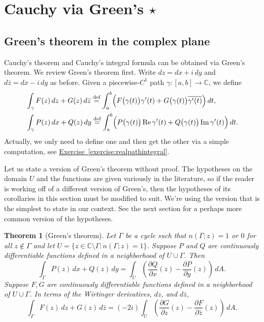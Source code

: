 \documentclass[12pt,openany]{book}
\renewcommand{\Re}{\operatorname{Re}}
\renewcommand{\Im}{\operatorname{Im}}
\newcommand{\C}{{\mathbb{C}}}
\theoremstyle{plain}
\newtheorem{thm}{Theorem}[section]
\theoremstyle{remark}
\theoremstyle{definition}
\theoremstyle{exercise}
\theoremstyle{example}
\newcommand{\exerciseref}[1]{\hyperref[#1]{Exercise~\ref*{#1}}}
\begin{document}

\section{Cauchy via Green's \texorpdfstring{$\star$}{*}}

\subsection{Green's theorem in the complex plane}

Cauchy's theorem and Cauchy's integral formula can be obtained via 
Green's theorem.
We review Green's theorem first.
Write $dz = dx + i\, dy$ and $d\bar{z} = dx - i \, dy$ as before.
Given a piecewise-$C^1$ path $\gamma \colon [a,b] \to \C$, we define
\begin{align*}
& \int_\gamma
F(z) \, dz + G(z) \, d\bar{z}
\overset{\text{def}}{=}
\int_a^b 
\Bigl(F\bigl(\gamma(t)\bigr) \gamma'(t) + G\bigl(\gamma(t)\bigr)
\overline{\gamma'(t)} \Bigr) \, dt ,
\\
& \int_\gamma
P(z) \, dx + Q(z) \, dy
\overset{\text{def}}{=}
\int_a^b 
\Bigl(P\bigl(\gamma(t)\bigr) \Re \gamma'(t) + Q\bigl(\gamma(t)\bigr) \Im
\gamma'(t) \Bigr) \, dt .
\end{align*}
Actually, we only need to define one and then get the other via a simple
computation, see \exerciseref{exercise:realpathintegral}.

Let us state a version of Green's theorem without proof.
The hypotheses on the domain $U$ and the functions are given variously in the literature,
so if the reader is working off of a different version of Green's, then the
hypotheses of its corollaries in this section must be modified to suit.
We're using the version that is the simplest to state in our context.
See the next section for a perhaps more common version of the hypotheses.

\begin{thm}[Green's theorem] \label{thm:greens}
Let $\Gamma$ be a cycle
such that $n(\Gamma;z) = 1$ or $0$ for all $z \notin \Gamma$ and let
$U = \{ z \in \C \setminus \Gamma : n(\Gamma;z) = 1 \}$.
Suppose 
$P$ and $Q$ are continuously differentiable functions defined in a neighborhood
of $U \cup \Gamma$.
Then
\begin{equation*}
\int_{\Gamma} P(z) \, dx + Q(z) \, dy
=
\int_{U}
\left(
\frac{\partial Q}{\partial x}(z)
-
\frac{\partial P}{\partial y}(z)
\right)
\, dA .
\end{equation*}
Suppose $F,G$ are continuously differentiable functions defined in a neighborhood
of $U \cup \Gamma$.
In terms of the Wirtinger derivatives, $dz$, and $d \bar{z}$,
\begin{equation*}
\int_{\Gamma} F(z) \, dz + G(z) \, d\bar{z}
=
(-2i)
\int_{U}
\left(
\frac{\partial G}{\partial z}(z)
-
\frac{\partial F}{\partial \bar{z}}(z)
\right)
\, dA .
\end{equation*}
\end{thm}
\end{document}
